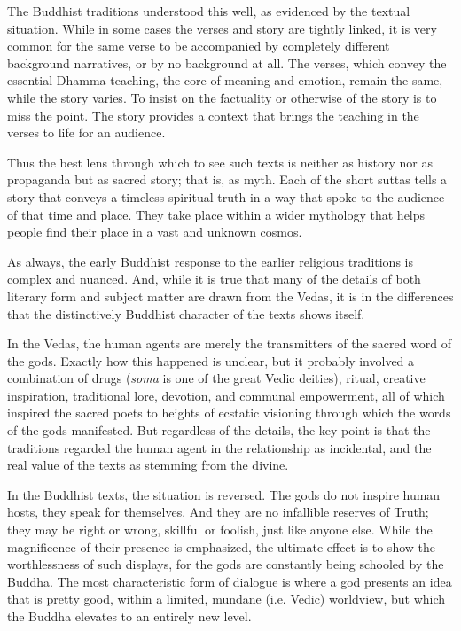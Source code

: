 \documentclass[12pt,openany]{book}%
\begin{document}
The Buddhist traditions understood this well, as evidenced by the textual situation. While in some cases the verses and story are tightly linked, it is very common for the same verse to be accompanied by completely different background narratives, or by no background at all. The verses, which convey the essential Dhamma teaching, the core of meaning and emotion, remain the same, while the story varies. To insist on the factuality or otherwise of the story is to miss the point. The story provides a context that brings the teaching in the verses to life for an audience.

Thus the best lens through which to see such texts is neither as history nor as propaganda but as sacred story; that is, as myth. Each of the short suttas tells a story that conveys a timeless spiritual truth in a way that spoke to the audience of that time and place. They take place within a wider mythology that helps people find their place in a vast and unknown cosmos.

As always, the early Buddhist response to the earlier religious traditions is complex and nuanced. And, while it is true that many of the details of both literary form and subject matter are drawn from the Vedas, it is in the differences that the distinctively Buddhist character of the texts shows itself.

In the Vedas, the human agents are merely the transmitters of the sacred word of the gods. Exactly how this happened is unclear, but it probably involved a combination of drugs (\textit{soma} is one of the great Vedic deities), ritual, creative inspiration, traditional lore, devotion, and communal empowerment, all of which inspired the sacred poets to heights of ecstatic visioning through which the words of the gods manifested. But regardless of the details, the key point is that the traditions regarded the human agent in the relationship as incidental, and the real value of the texts as stemming from the divine.

In the Buddhist texts, the situation is reversed. The gods do not inspire human hosts, they speak for themselves. And they are no infallible reserves of Truth; they may be right or wrong, skillful or foolish, just like anyone else. While the magnificence of their presence is emphasized, the ultimate effect is to show the worthlessness of such displays, for the gods are constantly being schooled by the Buddha. The most characteristic form of dialogue is where a god presents an idea that is pretty good, within a limited, mundane (i.e. Vedic) worldview, but which the Buddha elevates to an entirely new level.
\end{document}
